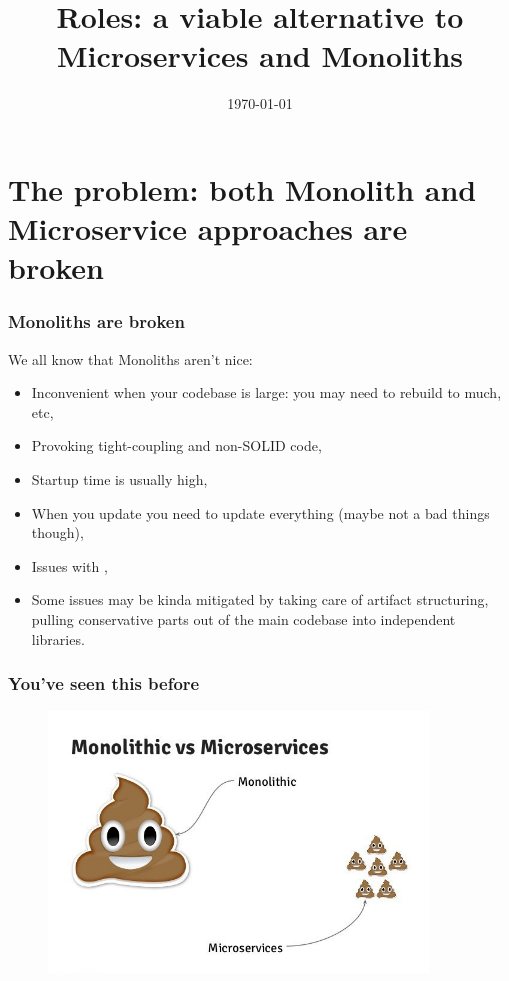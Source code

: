 \documentclass[usenames,dvipsnames]{beamer}
\title[Roles]{Roles: a viable alternative to Microservices and Monoliths}
\institute[Septimal Mind Ltd]
    {
    Septimal Mind Ltd\\
    \medskip
    \textit{team@7mind.io}
    }
\date{\today}
\begin{document}
\begin{frame}
\titlepage
\end{frame}

\section{The problem: both Monolith and Microservice approaches are broken}

\begin{frame}
\frametitle{Monoliths are broken}
We all know that Monoliths aren't nice:
\begin{itemize}
\item Inconvenient when your codebase is large: you may need to rebuild to much, etc,
\item Provoking tight-coupling and non-SOLID code,
\item Startup time is usually high,
\item When you update you need to update everything (maybe not a bad things though),
\item Issues with ,
\item Some issues may be kinda mitigated by taking care of artifact structuring,
      pulling conservative parts out of the main codebase into independent libraries.
\end{itemize}
\end{frame}

\begin{frame}
\frametitle{You've seen this before}
\begin{figure}
    \includegraphics[width=0.9\textwidth]{media/mono-ms-joke.jpg}
\end{figure}
\end{frame}
\end{document}
